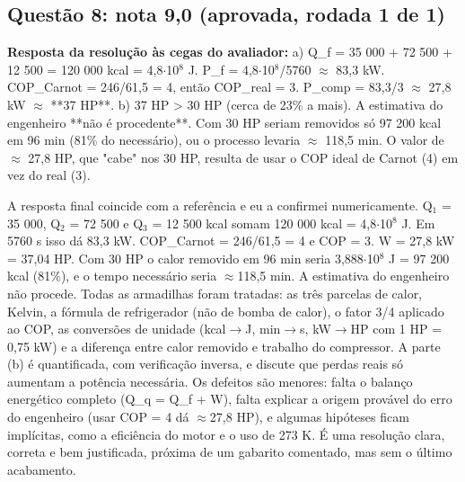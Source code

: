 \documentclass{article}%
\begin{document}
\subsection*{Questão 8: nota 9,0 (aprovada, rodada 1 de 1)}%
\textbf{Resposta da resolução às cegas do avaliador:} a) Q\_f = 35 000 + 72 500 + 12 500 = 120 000 kcal = 4,8$\cdot$10$^{8}$ J. P\_f = 4,8$\cdot$10$^{8}$/5760 $\approx$ 83,3 kW. COP\_Carnot = 246/61,5 = 4, então COP\_real = 3. P\_comp = 83,3/3 $\approx$ 27,8 kW $\approx$ **37 HP**.\newline%
\newline%
b) 37 HP > 30 HP (cerca de 23\% a mais). A estimativa do engenheiro **não é procedente**. Com 30 HP seriam removidos só 97 200 kcal em 96 min (81\% do necessário), ou o processo levaria $\approx$ 118,5 min. O valor de $\approx$ 27,8 HP, que "cabe" nos 30 HP, resulta de usar o COP ideal de Carnot (4) em vez do real (3).\par %
A resposta final coincide com a referência e eu a confirmei numericamente. Q$_{1}$ = 35 000, Q$_{2}$ = 72 500 e Q$_{3}$ = 12 500 kcal somam 120 000 kcal = 4,8$\cdot$10$^{8}$ J. Em 5760 s isso dá 83,3 kW. COP\_Carnot = 246/61,5 = 4 e COP = 3. W = 27,8 kW = 37,04 HP. Com 30 HP o calor removido em 96 min seria 3,888$\cdot$10$^{8}$ J = 97 200 kcal (81\%), e o tempo necessário seria $\approx$118,5 min. A estimativa do engenheiro não procede. Todas as armadilhas foram tratadas: as três parcelas de calor, Kelvin, a fórmula de refrigerador (não de bomba de calor), o fator 3/4 aplicado ao COP, as conversões de unidade (kcal$\to$J, min$\to$s, kW$\to$HP com 1 HP = 0,75 kW) e a diferença entre calor removido e trabalho do compressor. A parte (b) é quantificada, com verificação inversa, e discute que perdas reais só aumentam a potência necessária. Os defeitos são menores: falta o balanço energético completo (Q\_q = Q\_f + W), falta explicar a origem provável do erro do engenheiro (usar COP = 4 dá $\approx$27,8 HP), e algumas hipóteses ficam implícitas, como a eficiência do motor e o uso de 273 K. É uma resolução clara, correta e bem justificada, próxima de um gabarito comentado, mas sem o último acabamento.%
\end{document}
